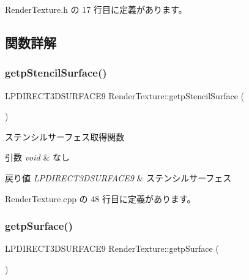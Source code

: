 Render\+Texture.\+h の 17 行目に定義があります。



\subsection{関数詳解}
\mbox{\label{class_render_texture_a8e858951717af1e9d47ca3a2d3f61263}} 
\subsubsection{\texorpdfstring{getp\+Stencil\+Surface()}{getpStencilSurface()}}
{\footnotesize\ttfamily L\+P\+D\+I\+R\+E\+C\+T3\+D\+S\+U\+R\+F\+A\+C\+E9 Render\+Texture\+::getp\+Stencil\+Surface (\begin{DoxyParamCaption}{ }\end{DoxyParamCaption})}



ステンシルサーフェス取得関数 


\begin{DoxyParams}{引数}
{\em void} & なし \\
\hline
\end{DoxyParams}

\begin{DoxyRetVals}{戻り値}
{\em L\+P\+D\+I\+R\+E\+C\+T3\+D\+S\+U\+R\+F\+A\+C\+E9} & ステンシルサーフェス \\
\hline
\end{DoxyRetVals}


 Render\+Texture.\+cpp の 48 行目に定義があります。

\mbox{\label{class_render_texture_aa616a3953ced62a67534748d24dbb00f}} 
\subsubsection{\texorpdfstring{getp\+Surface()}{getpSurface()}}
{\footnotesize\ttfamily L\+P\+D\+I\+R\+E\+C\+T3\+D\+S\+U\+R\+F\+A\+C\+E9 Render\+Texture\+::getp\+Surface (\begin{DoxyParamCaption}{ }\end{DoxyParamCaption})}




